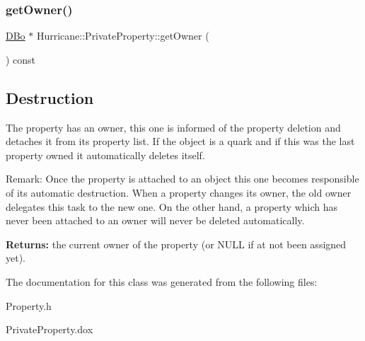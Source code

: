 \subsubsection{\texorpdfstring{get\+Owner()}{getOwner()}}
{\footnotesize\ttfamily \mbox{\hyperlink{classHurricane_1_1DBo}{D\+Bo}} $\ast$ Hurricane\+::\+Private\+Property\+::get\+Owner (\begin{DoxyParamCaption}{ }\end{DoxyParamCaption}) const\hspace{0.3cm}{\ttfamily [inline]}}

\hypertarget{classHurricane_1_1PrivateProperty_secPrivatePropertyDestruction}{}\subsection{Destruction}\label{classHurricane_1_1PrivateProperty_secPrivatePropertyDestruction}
The property has an owner, this one is informed of the property deletion and detaches it from its property list. If the object is a quark and if this was the last property owned it automatically deletes itself.

\begin{DoxyParagraph}{Remark\+: Once the property is attached to an object this one becomes }
responsible of its automatic destruction. When a property changes its owner, the old owner delegates this task to the new one. On the other hand, a property which has never been attached to an owner will never be deleted automatically.
\end{DoxyParagraph}
{\bfseries Returns\+:} the current owner of the property (or N\+U\+LL if at not been assigned yet). 

The documentation for this class was generated from the following files\+:\begin{DoxyCompactItemize}
\item 
Property.\+h\item 
Private\+Property.\+dox\end{DoxyCompactItemize}
